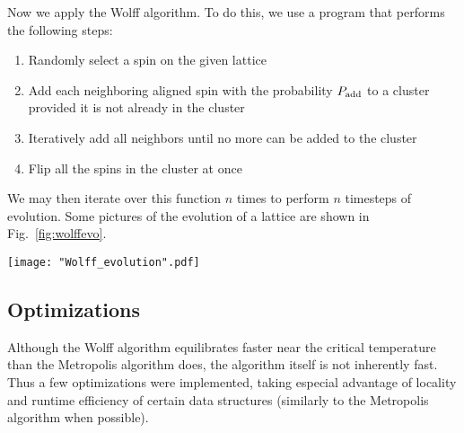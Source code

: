 \documentclass[twocolumn,aps,prl]{revtex4-1} %
\begin{document}
Now we apply the Wolff algorithm. To do this, we use a program that performs the following steps:
\begin{enumerate}
	\item Randomly select a spin on the given lattice
	\item Add each neighboring aligned spin with the probability $P_{\rm add}$ to a cluster provided it is not already in the cluster
	\item Iteratively add all neighbors until no more can be added to the cluster
	\item Flip all the spins in the cluster at once
\end{enumerate}

We may then iterate over this function $n$ times to perform $n$ timesteps of evolution. Some pictures of the evolution of a lattice are shown in Fig.~\ref{fig:wolffevo}.
\begin{figure*}
	\texttt{[image: "Wolff\_evolution".pdf]}
	\caption{\label{fig:wolffevo}The evolution of a $100 \times 100$ square lattice at $T = 2.4$ via the Wolff algorithm. The sequence is ordered from left to right, top to bottom. The two spin states $+1$ and $-1$ correspond to black and white, respectively. We have initialized the system in the $T = 0$ state, and plotted the system after 0, 1, 5, 10, 20, 50, 100, 500, and 1000 Monte Carlo steps. The lattice equilibrates much faster through the Wolff algorithm than through the Metropolis algorithm.}
\end{figure*}

\subsection{Optimizations}
Although the Wolff algorithm equilibrates faster near the critical temperature than the Metropolis algorithm does, the algorithm itself is not inherently fast. Thus a few optimizations were implemented, taking especial advantage of locality and runtime efficiency of certain data structures (similarly to the Metropolis algorithm when possible).
\end{document}
